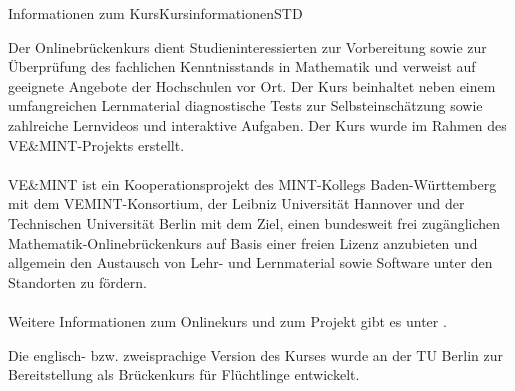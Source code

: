 \begin{MXContent}{Informationen zum Kurs}{Kursinformationen}{STD}

Der Onlinebrückenkurs dient Studieninteressierten zur Vorbereitung sowie zur Überprüfung des fachlichen Kenntnisstands in Mathematik
und verweist auf geeignete Angebote der Hochschulen vor Ort. Der Kurs beinhaltet neben einem umfangreichen Lernmaterial diagnostische Tests zur Selbsteinschätzung
sowie zahlreiche Lernvideos und interaktive Aufgaben. Der Kurs wurde im Rahmen des VE\&MINT-Projekts erstellt.
\ \\ \ \\
VE\&MINT ist ein Kooperationsprojekt des MINT-Kollegs Baden-Württemberg
mit dem VEMINT-Konsortium, der Leibniz Universität Hannover und der Technischen Universität Berlin mit dem Ziel,
einen bundesweit frei zugänglichen Mathematik-Onlinebrückenkurs auf Basis einer freien Lizenz anzubieten und allgemein
den Austausch von Lehr- und Lernmaterial sowie Software unter den Standorten zu fördern.
\ \\ \ \\
Weitere Informationen zum Onlinekurs und zum Projekt gibt es unter .

Die englisch- bzw. zweisprachige Version des Kurses wurde an der TU Berlin zur Bereitstellung als Brückenkurs
für Flüchtlinge entwickelt.
\end{MXContent}

